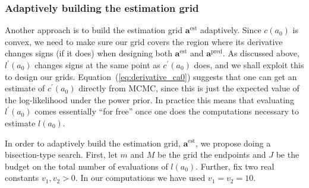 \documentclass[a4paper, notitlepage, 11pt]{article}
\begin{document}
\subsubsection{Adaptively building the estimation grid}
\label{sec:adapt_grid}

Another approach is to build the estimation grid $\boldsymbol a^{\text{est}}$ adaptively.
Since $c(a_0)$ is convex, we need to make sure our grid covers the region where its derivative changes signs (if it does) when designing both $\boldsymbol a^{\text{est}}$ and $\boldsymbol a^{\text{pred}}$.
As discussed above, $l^\prime(a_0)$ changes signs at the same point as $c^\prime(a_0)$ does, and we shall exploit this to design our grids.
Equation~(\ref{eq:derivative_ca0}) suggests that one can get an estimate of $c^\prime(a_0)$ directly from MCMC, since this is just the expected value of the log-likelihood under the power prior.
In practice this means that evaluating $l^\prime(a_0)$ comes essentially ``for free'' once one does the computations necessary to estimate $l(a_0)$.

In order to adaptively build the estimation grid, $\boldsymbol a^{\text{est}}$, we propose doing a bisection-type search.
First, let $m$ and $M$ be the grid the endpoints and $J$ be the budget on the total number of evaluations of $l(a_0)$.
Further, fix two real constants $v_1, v_2 > 0$.
In our computations we have used $v_1 = v_2 =  10$. 
\end{document}
